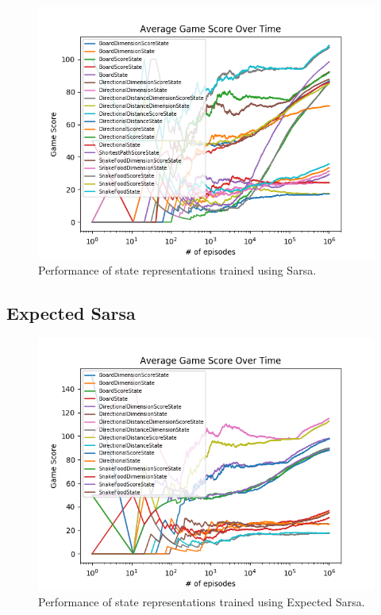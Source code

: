 \documentclass[result.tex]{subfiles}
\begin{document}
    \begin{figure}[ht]
        \centering
        \includegraphics[width=\linewidth]{../images/sarsa/state/234/all_average_game_score_over_time.png}
        \caption{Performance of state representations trained using Sarsa.}
        \label{fig:app_state_sarsa}
    \end{figure}

    \newpage

    \subsection{Expected Sarsa}

    \begin{figure}[ht]
        \centering
        \includegraphics[width=\linewidth]{../images/expected_sarsa/state/234/all_average_game_score_over_time.png}
        \caption{Performance of state representations trained using Expected Sarsa.}
        \label{fig:app_state_expected_sarsa}
    \end{figure}
\end{document}
